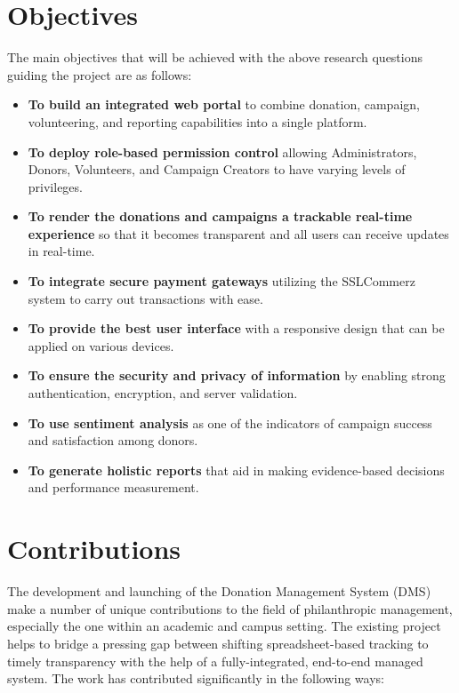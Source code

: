 \documentclass{thesis-library}
\begin{document}
\section{Objectives}
The main objectives that will be achieved with the above research questions guiding the project are as follows:
\begin{itemize}
    \item \textbf{To build an integrated web portal} to combine donation, campaign, volunteering, and reporting capabilities into a single platform.
    \item \textbf{To deploy role-based permission control} allowing Administrators, Donors, Volunteers, and Campaign Creators to have varying levels of privileges.
    \item \textbf{To render the donations and campaigns a trackable real-time experience} so that it becomes transparent and all users can receive updates in real-time.
    \item \textbf{To integrate secure payment gateways} utilizing the SSLCommerz system to carry out transactions with ease.
    \item \textbf{To provide the best user interface} with a responsive design that can be applied on various devices.
    \item \textbf{To ensure the security and privacy of information} by enabling strong authentication, encryption, and server validation.
    \item \textbf{To use sentiment analysis} as one of the indicators of campaign success and satisfaction among donors.
    \item \textbf{To generate holistic reports} that aid in making evidence-based decisions and performance measurement.
\end{itemize}

\newpage
\section{Contributions}

The development and launching of the Donation Management System (DMS) make a number of unique contributions to the field of philanthropic management, especially the one within an academic and campus setting. The existing project helps to bridge a pressing gap between shifting spreadsheet-based tracking to timely transparency with the help of a fully-integrated, end-to-end managed system. The work has contributed significantly in the following ways:
\end{document}
